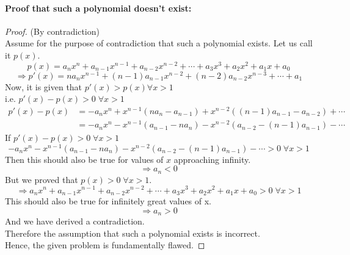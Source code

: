 \documentclass[14]{article}
\theoremstyle{definition}
\theoremstyle{case}
\begin{document}
\paragraph{Proof that such a polynomial doesn't exist:}
\begin{proof} (By contradiction)\\
Assume for the purpose of contradiction that such a polynomial exists. Let us call it $p(x).$\\
\[p(x) = a_n x^n + a_{n-1} x^{n-1} + a_{n-2} x^{n-2} + \cdots + a_3 x^3 + a_2 x^2 + a_1 x + a_0\]
\[\Rightarrow p'(x) = n a_n x^{n-1} + (n-1)a_{n-1}x^{n-2} + (n-2) a_{n-2}x^{n-3} + \cdots + a_1\]
Now, it is given that $p'(x) > p(x) \forall x > 1$\\
i.e. $p'(x) - p(x) > 0\; \forall x > 1$
\begin{align*}
p'(x) - p(x) &= -a_n x^n + x^{n-1} (na_n - a_{n-1}) + x^{n-2} \left((n-1)a_{n-1} - a_{n-2}\right)+ \cdots \\
&= -a_n x^n - x^{n-1}(a_{n-1} - na_n) - x^{n-2} \left( a_{n-2} - (n-1)a_{n-1}\right) - \cdots
\end{align*}
If $p'(x) - p(x) > 0 \; \forall x > 1$
\[-a_n x^n - x^{n-1}(a_{n-1} - na_n) - x^{n-2} \left( a_{n-2} - (n-1)a_{n-1}\right) - \cdots > 0 \; \forall x > 1\]
Then this should also be true for values of $x$ approaching infinity.\\
\[\Rightarrow a_n < 0\]
But we proved that $p(x) > 0 \; \forall x > 1$.
\[\Rightarrow a_n x^n + a_{n-1} x^{n-1} + a_{n-2} x^{n-2} + \cdots + a_3 x^3 + a_2 x^2 + a_1 x + a_0 > 0 \;\forall x > 1\]
This should also be true for infinitely great values of x.
\[\Rightarrow a_n > 0\]
And we have derived a contradiction.\\
Therefore the assumption that such a polynomial exists is incorrect.\\
Hence, the given problem is fundamentally flawed.
\end{proof}
\pagebreak
\end{document}
